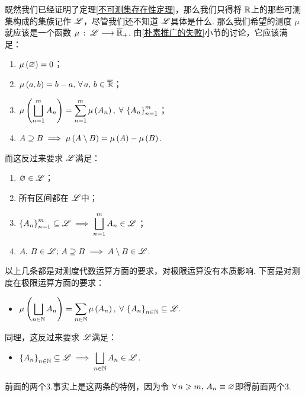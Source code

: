 既然我们已经证明了定理\ref{不可测集存在性定理}，那么我们只得将 $\mathbb{R}$上的那些可测集构成的集族记作 $\mathscr{L}$，尽管我们还不知道 $\mathscr{L}$具体是什么. 那么我们希望的测度 $\mu$就应该是一个函数 $\mu\,:\;\mathscr{L}\longrightarrow\overline{\mathbb{R}}_+$. 由\ref{朴素推广的失败}小节的讨论，它应该满足：
\begin{enumerate}
    \item $\mu\left(\varnothing\right)=0$；
    \item $\mu\z(a,b\y)=b-a,\,\forall\,a,\,b\in\Bar{\R}$；
    \item $\displaystyle \mu\left( \bigsqcup_{n=1}^m A_n \right) = \sum_{n=1}^m \mu\left( A_n \right),\;\forall\,\left\{A_n\right\}_{n=1}^m$；
    \item $A\supseteq B \implies \mu\left(A\setminus B\right)=\mu\left(A\right)-\mu\left(B\right)$.
\end{enumerate}
而这反过来要求 $\mathscr{L}$满足：
\begin{enumerate}
    \item $\varnothing\in\mathscr{L}$；
    \item 所有区间都在 $\mathscr{L}$中；
    \item $\displaystyle \left\{A_n\right\}_{n=1}^m\subseteq\mathscr{L} \implies \bigsqcup_{n=1}^m A_n\in\mathscr{L}$；
    \item $A,\,B\in\mathscr{L};\,A\supseteq B \implies A\setminus B\in\mathscr{L}$.
\end{enumerate}
以上几条都是对测度代数运算方面的要求，对极限运算没有本质影响. 下面是对测度在极限运算方面的要求：
\begin{itemize}
    \item $\displaystyle \mu\left( \bigsqcup_{n\in\mathbb{N}} A_n \right) = \sum_{n\in\mathbb{N}} \mu\left( A_n \right),\;\forall\,\left\{A_n\right\}_{n\in\mathbb{N}}\subseteq\mathscr{L}.$
\end{itemize}
同理，这反过来要求 $\mathscr{L}$满足：
\begin{itemize}
    \item $\displaystyle \left\{A_n\right\}_{n\in\mathbb{N}}\subseteq\mathscr{L} \implies \bigsqcup_{n\in\mathbb{N}} A_n\in\mathscr{L}$.
\end{itemize}
前面的两个3.事实上是这两条的特例，因为令 $\forall\,n\geqslant m,\,A_n\equiv\varnothing$即得前面两个3.
\vspace{0.5cm}

